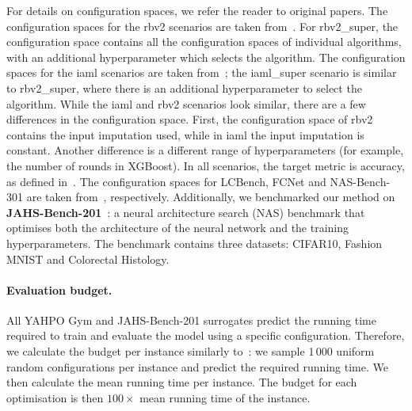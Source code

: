 For details on configuration spaces, we refer the reader to original papers.
The configuration spaces for the rbv2 scenarios are taken from~\citep{BinEtAl20}. 
For rbv2\_super, the configuration space contains all the configuration spaces of individual algorithms, with an additional hyperparameter which selects the algorithm. 
The configuration spaces for the iaml scenarios are taken from~\citep{PfiEtAl22}; the iaml\_super scenario is similar to rbv2\_super, where there is an additional hyperparameter to select the algorithm. 
While the iaml and rbv2 scenarios look similar, there are a few differences in the configuration space. 
First, the configuration space of rbv2 contains the input imputation used, while in iaml the input imputation is constant. 
Another difference is a different range of hyperparameters (for example, the number of rounds in XGBoost). 
In all scenarios, the target metric is accuracy, as defined in~\citep{PfiEtAl22}.  
The configuration spaces for LCBench, FCNet and NAS-Bench-301 are taken from~\citep{ZimEtAl21b,FalEtAl18,ZelEtAl22}, respectively.
Additionally, we benchmarked our method on \textbf{JAHS-Bench-201}~\citep{BanEtAl22}: a neural architecture search (NAS) benchmark that optimises both the architecture of the neural network and the training hyperparameters. The benchmark contains three datasets: CIFAR10, Fashion MNIST and Colorectal Histology.

\paragraph{Evaluation budget.}
All YAHPO Gym and JAHS-Bench-201 surrogates predict the running time required to train and evaluate the model using a specific configuration. 
Therefore, we calculate the budget per instance similarly to~\citet{EggEtAl21b}: we sample 1\,000 uniform random configurations per instance and predict the required running time.
We then calculate the mean running time per instance. 
The budget for each optimisation is then $100\times $ mean running time of the instance. 



